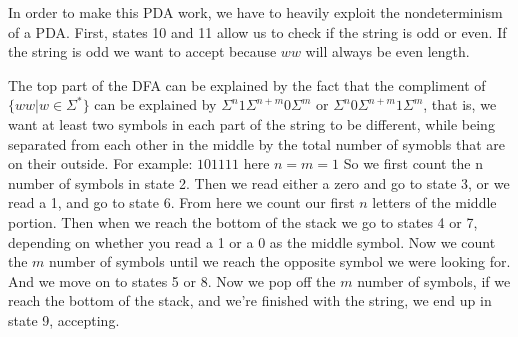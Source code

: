\documentclass{article}
\begin{document}
\begin{enumerate}[(a)]

    In order to make this PDA work, we have to heavily exploit the nondeterminism of a PDA.
    First, states 10 and 11 allow us to check if the string is odd or even. If the string is
    odd we want to accept because $ww$ will always be even length.

    The top part of the DFA can be explained by the fact that the compliment of
    $\{ww|w\in\Sigma^*\}$ can be explained by $\Sigma^n1\Sigma^{n+m}0\Sigma^m$ or
    $\Sigma^n0\Sigma^{n+m}1\Sigma^m$, that is, we want at least two symbols in each part of the
    string to be different, while being separated from each other in the middle by the total
    number of symobls that are on their outside. For example: $101111$ here $n=m=1$
    So we first count the n number of symbols in state 2. Then we read either a zero and go
    to state 3, or we read a 1, and go to state 6. From here we count our first $n$ letters
    of the middle portion. Then when we reach the bottom of the stack we go to states 4 or 7,
    depending on whether you read a 1 or a 0 as the middle symbol. Now we count the $m$ number
    of symbols until we reach the opposite symbol we were looking for. And we move on to states
    5 or 8. Now we pop off the $m$ number of symbols, if we reach the bottom of the stack, and
    we're finished with the string, we end up in state 9, accepting.


\end{enumerate}
\end{document}
